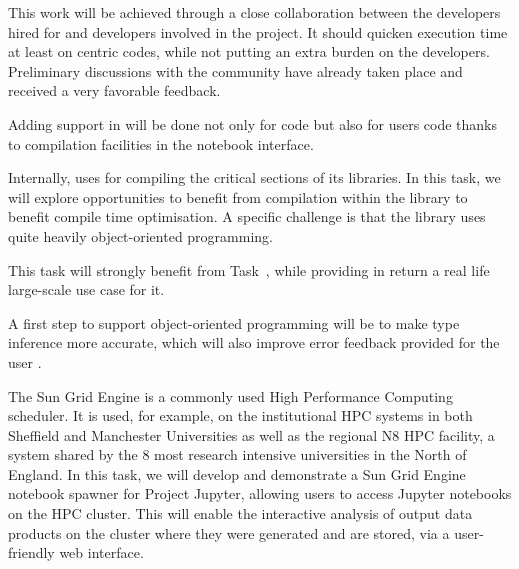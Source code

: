 \begin{workpackage}
\begin{tasklist}
\begin{task}[title=Pythran,id=pythran]
  This work will be achieved through a close collaboration between the \Pythran
  developers hired for \TheProject and \Cython developers involved in the \Sage
  project. It should quicken \Sage execution time at least on \Numpy centric
  codes, while not putting an extra burden on the developers.  Preliminary
  discussions with the \Cython community have already taken place and received a
  very favorable feedback.

  Adding \Pythran support in \Sage will be done not only for \Sage code but also
  for \Sage users code thanks to compilation facilities in the notebook interface.


  Internally, \Sage uses \Cython for compiling the critical sections of
  its libraries. In this task, we will explore opportunities to
  benefit from \Pythran compilation within the \Sage library to benefit
  \Pythran compile time optimisation. A specific challenge is that the \Sage
  library uses quite heavily object-oriented programming.

  This task will strongly benefit from Task~,
  while providing in return a real life large-scale use case for it.

  A first step to support object-oriented programming will be to make
  \Pythran type inference more accurate, which will also improve error
  feedback provided for the user .
\end{task}

\begin{task}[title=Sun Grid Engine Integration in Project Jupyter Hub]
The Sun Grid Engine is a commonly used High Performance Computing scheduler. It is used, for example, on the institutional HPC systems in both Sheffield and Manchester Universities as well as the regional N8 HPC facility, a system shared by the 8 most research intensive universities in the North of England. In this task, we will develop and demonstrate a Sun Grid Engine notebook spawner for Project Jupyter, allowing users to access Jupyter notebooks on the HPC cluster. This will enable the interactive analysis of output data products on the cluster where they were generated and are stored, via a user-friendly web interface.
\end{task}


\end{tasklist}
\end{workpackage}
